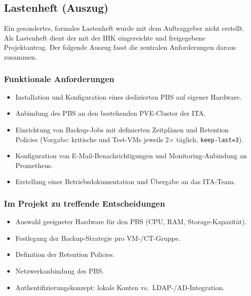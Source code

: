 \clearpage
\subsection{Lastenheft (Auszug)}
\label{app:Lastenheft}

Ein gesondertes, formales Lastenheft wurde mit dem Auftraggeber
nicht erstellt. Als Lastenheft dient der mit der \ac{IHK}
eingereichte und freigegebene Projektantrag. Der folgende Auszug
fasst die zentralen Anforderungen daraus zusammen.

\subsubsection*{Funktionale Anforderungen}
\begin{itemize}
    \item Installation und Konfiguration eines dedizierten
          \acl{PBS} auf eigener Hardware.
    \item Anbindung des \ac{PBS} an den bestehenden \ac{PVE}-Cluster
          der \ac{ITA}.
    \item Einrichtung von Backup-Jobs mit definierten Zeitplänen
          und Retention Policies (Vorgabe: kritische und
          Test-\acp{VM} jeweils 2$\times$ täglich, \texttt{keep-last=3}).
    \item Konfiguration von E-Mail-Benachrichtigungen und
          Monitoring-Anbindung an Prometheus.
    \item Erstellung einer Betriebsdokumentation und Übergabe an
          das \ac{ITA}-Team.
\end{itemize}

\subsubsection*{Im Projekt zu treffende Entscheidungen}
\begin{itemize}
    \item Auswahl geeigneter Hardware für den \ac{PBS}
          (CPU, \ac{RAM}, Storage-Kapazität).
    \item Festlegung der Backup-Strategie pro \ac{VM}-/\ac{CT}-Gruppe.
    \item Definition der Retention Policies.
    \item Netzwerkanbindung des \ac{PBS}.
    \item Authentifizierungskonzept: lokale Konten vs.\
          \ac{LDAP}-/\ac{AD}-Integration.
\end{itemize}

